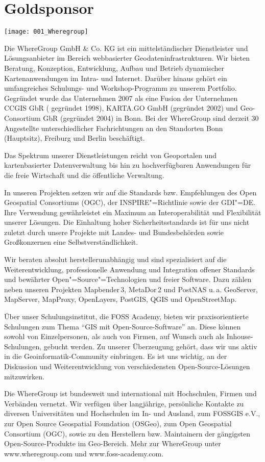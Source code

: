 \section*{Goldsponsor}
\begin{center}
	\texttt{[image: 001\_Wheregroup]}
\end{center}
Die WhereGroup GmbH \& Co. KG ist ein mittelständischer Dienstleister und Lösungsanbieter im Bereich webbasierter
Geodateninfrastrukturen. Wir bieten Beratung, Konzeption, Entwicklung, Aufbau und Betrieb
dynamischer Kartenanwendungen im Intra- und Internet. Darüber hinaus gehört ein umfangreiches
Schulungs- und Workshop-Programm zu unserem Portfolio. Gegründet wurde das Unternehmen 2007 als
eine Fusion der Unternehmen CCGIS GbR ( gegründet 1998), KARTA.GO GmbH (gegründet 2002) und
Geo-Consortium GbR (gegründet 2004) in Bonn. Bei der WhereGroup sind derzeit 30 Angestellte
unterschiedlicher Fachrichtungen an den Standorten Bonn (Hauptsitz), Freiburg und Berlin
beschäftigt.

Das Spektrum unserer Dienstleistungen reicht von Geoportalen und kartenbasierter
Datenverwaltung bis hin zu hochverfügbaren Anwendungen für die freie Wirtschaft und die öffentliche
Verwaltung.

In unseren Projekten setzen wir auf die Standards bzw. Empfehlungen des Open Geospatial
Consortiums (OGC), der INSPIRE"=Richtlinie sowie der GDI"=DE. Ihre Verwendung gewährleistet ein Maximum
an Interoperabilität und Flexibilität unserer Lösungen. Die Einhaltung hoher Sicherheitsstandards
ist für uns nicht zuletzt durch unsere Projekte mit Landes- und Bundesbehörden sowie Großkonzernen
eine Selbst\-ver\-ständ\-lichkeit.

Wir beraten absolut herstellerunabhängig und sind spezialisiert auf die Weiterentwicklung,
professionelle Anwendung und Integration offener Standards und bewährter
Open"=Source"=Technologien und freier Software. Dazu zählen neben unseren Projekten Mapbender\,3,
MetaDor\,2 und PostNAS u.\,a. GeoServer, MapServer, MapProxy, OpenLay\-ers, PostGIS, QGIS und
OpenStreetMap.

Über unser Schulungsinstitut, die FOSS Academy, bieten wir praxisorientierte
Schulungen zum Thema "`GIS mit Open-Source-Software"' an. Diese können sowohl von Einzelpersonen, als
auch von Firmen, auf Wunsch auch als Inhouse-Schulungen, gebucht werden.
Zu unserer Überzeugung
gehört, dass wir uns aktiv in die Geoinformatik-Community einbringen. Es ist uns wichtig, an der
Diskussion und Weiterentwicklung von verschiedensten Open-Source-Lösungen mitzuwirken.

\enlargethispage{1.5\baselineskip}
Die WhereGroup ist bundesweit und international mit Hochschulen, Firmen und Verbänden vernetzt. Wir
verfügen über langjährige, persönliche Kontakte zu diversen Universitäten und Hochschulen im In- und
Ausland, zum FOSSGIS e.V., zur Open Source Geospatial Foundation (OSGeo), zum Open Geospatial
Consortium (OGC), sowie zu den Herstellern bzw. Maintainern der gängigsten Open-Source-Produkte im
Geo-Bereich.  Mehr zur WhereGroup unter www.wheregroup.com und www.foss-academy.com.
